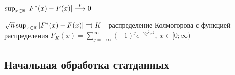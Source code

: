 \documentclass[12pt]{article}
\begin{document}
\begin{MyTheorem}
     $\sup_{x \in \mathbb{R}} |F^*(x) - F(x)| \overset{p}{\longrightarrow} 0$
\end{MyTheorem}

\begin{MyTheorem}
     $\sqrt{n} \sup_{x \in \mathbb{R}} |F^*(x) - F(x)| \rightrightarrows K$ - распределение Колмогорова с 
    функцией распределения $F_K(x) = \sum_{j = -\infty}^{\infty} (-1)^j e^{-2 j^2 x^2}, \ x \in [0;\infty)$
\end{MyTheorem}

\hypertarget{initial_data_processing}{}

\subsection{Начальная обработка статданных}
\end{document}

